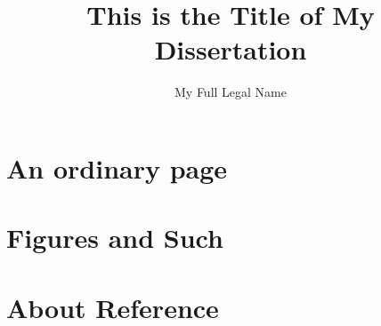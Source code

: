 \documentclass[12pt]{ucsddissertation}
\title{This is the Title of My Dissertation}
\author{My Full Legal Name}
\begin{document}
\frontmatter
\maketitle
\makecopyright
\makesignature





\tableofcontents
\listoffigures
\listoftables









\mainmatter



\chapter{An ordinary page}


\chapter{Figures and Such}


\chapter{About Reference}


\appendix
\Blinddocument

\backmatter

\end{document}
